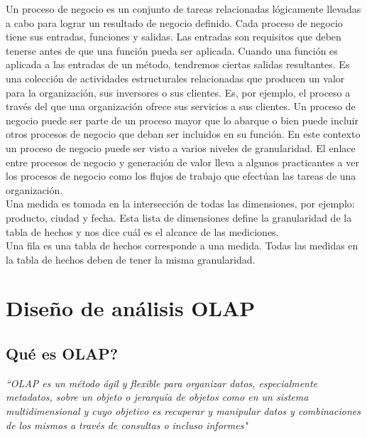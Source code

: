 \documentclass[DIV=calc, paper=a4, fontsize=11pt, twocolumn]{scrartcl}	 %
\begin{document}
Un proceso de negocio es un conjunto de tareas relacionadas l\'{o}gicamente llevadas a cabo para lograr un resultado de negocio definido. Cada 
proceso de negocio tiene sus entradas, funciones y salidas. Las entradas son requisitos que deben tenerse antes de que una funci\'{o}n 
pueda ser aplicada. Cuando una funci\'{o}n es aplicada a las entradas de un m\'{e}todo, tendremos ciertas salidas resultantes. 
Es una colecci\'{o}n de actividades estructurales relacionadas que producen un valor para la organizaci\'{o}n, sus inversores o sus clientes. 
Es, por ejemplo, el proceso a trav\'{e}s del que una organizaci\'{o}n ofrece sus servicios a sus clientes. 
Un proceso de negocio puede ser parte de un proceso mayor que lo abarque o bien puede incluir otros procesos de negocio que deban ser 
incluidos en su funci\'{o}n. En este contexto un proceso de negocio puede ser visto a varios niveles de granularidad. El enlace entre 
procesos de negocio y generaci\'{o}n de valor lleva a algunos practicantes a ver los procesos de negocio como los flujos de trabajo que 
efect\'{u}an las tareas de una organizaci\'{o}n.\\

Una medida es tomada en la intersecci\'{o}n de todas las dimensiones, por ejemplo: producto, ciudad y fecha. Esta lista de dimensiones define 
la granularidad de la tabla de hechos y nos dice cu\'{a}l es el alcance de las mediciones. \\
Una fila es una tabla de hechos corresponde a una medida. Todas las medidas en la tabla de hechos deben de tener la misma granularidad.\\

\section*{Dise\~{n}o de an\'{a}lisis OLAP}

\subsection*{Qu\'{e} es OLAP?}

\textit{``OLAP es un m\'{e}todo \'{a}gil y flexible para organizar datos, especialmente metadatos, sobre un objeto o jerarqu\'{i}a de objetos como en un sistema multidimensional y cuyo objetivo es recuperar y manipular datos y combinaciones de los mismos a trav\'{e}s de consultas o incluso informes"}
\end{document}
